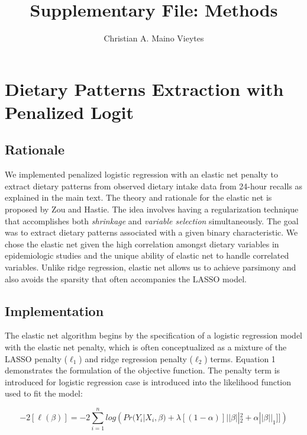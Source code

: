 \documentclass{article}
\title{Supplementary File: Methods}
\author{Christian A. Maino Vieytes}
\date{}
\begin{document}
\maketitle
{}

\tableofcontents


\section{Dietary Patterns Extraction with Penalized Logit}
\subsection{Rationale}
\hspace{\parindent} We implemented penalized logistic regression with an elastic net penalty to extract dietary patterns from observed dietary intake data from 24-hour recalls as explained in the main text. The theory and rationale for the elastic net is proposed by Zou and Hastie. \supercite{zou2005regularization} The idea involves having a regularization technique that accomplishes both \textit{shrinkage} and \textit{variable selection} simultaneously. The goal was to extract dietary patterns associated with a given binary characteristic. We chose the elastic net given the high correlation amongst dietary variables in epidemiologic studies and the unique ability of elastic net to handle correlated variables. Unlike ridge regression, elastic net allows us to achieve parsimony and also avoids the sparsity that often accompanies the LASSO model.\supercite{zou2005regularization}

\subsection{Implementation}
 \hspace{\parindent}The elastic net algorithm begins by the specification of a logistic regression model with the elastic net penalty, which is often conceptualized as a mixture of the LASSO penalty ($\ell_1$) and ridge regression penalty ($\ell_2$)  terms. Equation 1 demonstrates the formulation of the objective function. The penalty term is introduced for logistic regression case is introduced into the likelihood function used to fit the model:

\begin{equation}
	-2[\ell(\beta)]=-2\sum_{i=1}^nlog({Pr(Y_i|X_i,\beta)+\lambda[(1-\alpha)]||\beta||_2^2+\alpha||\beta||_1]]}) \tag{1}
\end{equation}
\end{document}
